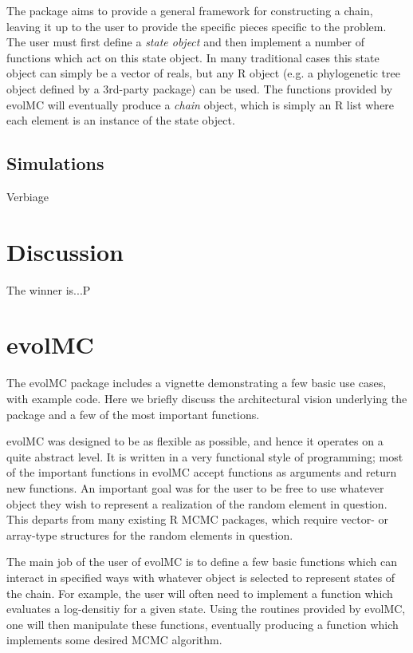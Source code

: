 \documentclass[12pt]{article}\usepackage[]{graphicx}\usepackage[]{color}
\begin{document}
The package aims to provide a general framework for constructing a
chain, leaving it up to the user to provide the specific pieces
specific to the problem. The user must first define a \emph{state
object} and then implement a number of functions which act on this
state object. In many traditional cases this state object can simply
be a vector of reals, but any R object (e.g. a phylogenetic tree
object defined by a 3rd-party package) can be used. The functions
provided by evolMC will eventually produce a \emph{chain} object,
which is simply an R list where each element is an instance of the
state object.

\subsection{Simulations}
\label{sec:simulations}

Verbiage

\section{Discussion}
\label{sec:discussion}
The winner is...P




\appendix

\section{evolMC}
\label{sec:evolmc}
The evolMC package includes a vignette demonstrating a few basic use
cases, with example code. Here we briefly discuss the architectural
vision underlying the package and a few of the most important
functions.

evolMC was designed to be as flexible as possible, and hence it
operates on a quite abstract level. It is written in a very functional
style of programming; most of the important functions in evolMC accept
functions as arguments and return new functions. An important goal was
for the user to be free to use whatever object they wish to represent
a realization of the random element in question. This departs from
many existing R MCMC packages, which require vector- or
array-type structures for the random elements in question.

The main job of the user of evolMC is to define a few basic functions
which can interact in specified ways with whatever object is selected
to represent states of the chain. For example, the user will often
need to implement a function which evaluates a log-densitiy for a
given state. Using the routines provided by evolMC, one will then
manipulate these functions, eventually producing a function which
implements some desired MCMC algorithm.
\end{document}
